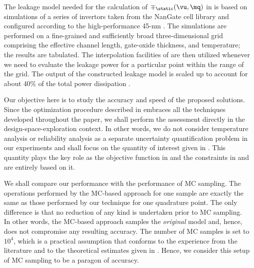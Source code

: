 The leakage model needed for the calculation of $\mp_\static(\vu, \mq)$ in
 is based on  simulations of a series of
 invertors taken from the NanGate cell library and configured according
to the high-performance 45-nm  \cite{ptm}. The simulations are performed
on a fine-grained and sufficiently broad three-dimensional grid comprising the
effective channel length, gate-oxide thickness, and temperature; the results are
tabulated. The interpolation facilities of  \cite{matlab} are then
utilized whenever we need to evaluate the leakage power for a particular point
within the range of the grid. The output of the constructed leakage model is
scaled up to account for about 40\% of the total power dissipation
\cite{liu2007}.


Our objective here is to study the accuracy and speed of the proposed solutions.
Since the optimization procedure described in 
embraces all the techniques developed throughout the paper, we shall perform the
assessment directly in the design-space-exploration context. In other words, we
do not consider temperature analysis or reliability analysis as a separate
uncertainty quantification problem in our experiments and shall focus on the
quantity of interest given in . This quantity plays
the key role as the objective function in  and the constraints
in  and  are entirely
based on it.

We shall compare our performance with the performance of \ac{MC} sampling. The
operations performed by the \ac{MC}-based approach for one sample are exactly
the same as those performed by our technique for one quadrature point. The only
difference is that no reduction of any kind is undertaken prior to \ac{MC}
sampling. In other words, the \ac{MC}-based approach samples the \emph{original}
model and, hence, does not compromise any resulting accuracy. The number of
\ac{MC} samples is set to $10^4$, which is a practical assumption that conforms
to the experience from the literature \cite{ukhov2014, lee2013, juan2012,
xiang2010} and to the theoretical estimates given in \cite{diaz-emparanza2002}.
Hence, we consider this setup of \ac{MC} sampling to be a paragon of accuracy.

